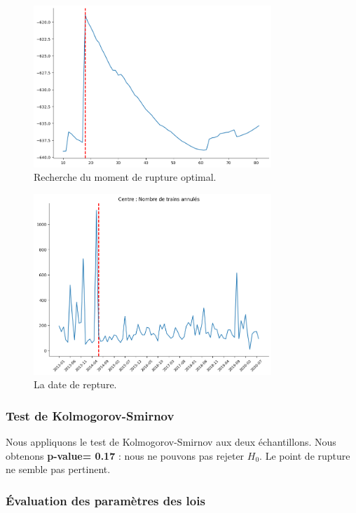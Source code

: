 {\begin{figure}[H]
\centering
\includegraphics[width=0.8\textwidth]{image/Cn-FIG09.png} 
\caption{Recherche du moment de rupture optimal.}
\label{fig:trains_ANNULES_2}
\end{figure}


\begin{figure}[H]
\centering
\includegraphics[width=0.8\textwidth]{image/Cn-FIG10.png} 
\caption{La date de repture.}
\label{fig:trains_ANNULES_2}
\end{figure}


\subsubsection{Test de Kolmogorov-Smirnov}

Nous appliquons le test de Kolmogorov-Smirnov aux deux échantillons. Nous obtenons \textbf{p-value= 0.17 }: nous ne pouvons pas rejeter $H_0$. Le point de rupture ne semble pas pertinent.

\subsubsection{Évaluation des paramètres des lois}


}
